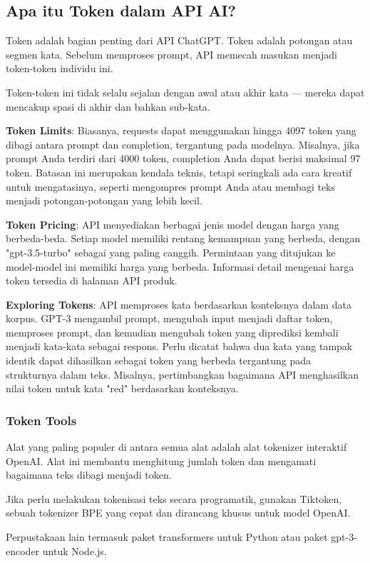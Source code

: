 \documentclass{article}
\begin{document}
\subsection{Apa itu Token dalam API AI?}
Token adalah bagian penting dari API ChatGPT. Token adalah potongan atau segmen kata. Sebelum memproses prompt, API memecah masukan menjadi token-token individu ini.

Token-token ini tidak selalu sejalan dengan awal atau akhir kata — mereka dapat mencakup spasi di akhir dan bahkan sub-kata.

\textbf{Token Limits}: Biasanya, requests dapat menggunakan hingga 4097 token yang dibagi antara prompt dan completion, tergantung pada modelnya. Misalnya, jika prompt Anda terdiri dari 4000 token, completion Anda dapat berisi maksimal 97 token. Batasan ini merupakan kendala teknis, tetapi seringkali ada cara kreatif untuk mengatasinya, seperti mengompres prompt Anda atau membagi teks menjadi potongan-potongan yang lebih kecil.

\textbf{Token Pricing}: API menyediakan berbagai jenis model dengan harga yang berbeda-beda. Setiap model memiliki rentang kemampuan yang berbeda, dengan "gpt-3.5-turbo" sebagai yang paling canggih. Permintaan yang ditujukan ke model-model ini memiliki harga yang berbeda. Informasi detail mengenai harga token tersedia di halaman API produk.

\textbf{Exploring Tokens}: API memproses kata berdasarkan konteksnya dalam data korpus. GPT-3 mengambil prompt, mengubah input menjadi daftar token, memproses prompt, dan kemudian mengubah token yang diprediksi kembali menjadi kata-kata sebagai respons. Perlu dicatat bahwa dua kata yang tampak identik dapat dihasilkan sebagai token yang berbeda tergantung pada strukturnya dalam teks. Misalnya, pertimbangkan bagaimana API menghasilkan nilai token untuk kata "red" berdasarkan konteksnya.

\subsubsection{Token Tools}
Alat yang paling populer di antara semua alat adalah alat tokenizer interaktif OpenAI. Alat ini membantu menghitung jumlah token dan mengamati bagaimana teks dibagi menjadi token.

Jika perlu melakukan tokenisasi teks secara programatik, gunakan Tiktoken, sebuah tokenizer BPE yang cepat dan dirancang khusus untuk model OpenAI.

Perpustakaan lain termasuk paket transformers untuk Python atau paket gpt-3-encoder untuk Node.js.
\end{document}
